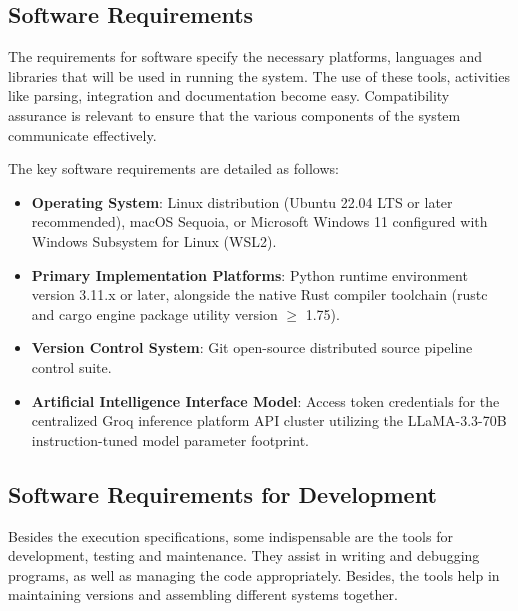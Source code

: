 \subsection{Software Requirements}
\hspace{0.5cm}
The requirements for software specify the necessary platforms, languages and libraries that will be used in running the system. The use of these tools, activities like parsing, integration and documentation become easy. Compatibility assurance is relevant to ensure that the various components of the system communicate effectively. 


The key software requirements are detailed as follows:
\begin{itemize}
    \item \textbf{Operating System}: Linux distribution (Ubuntu 22.04 LTS or later recommended), macOS Sequoia, or Microsoft Windows 11 configured with Windows Subsystem for Linux (WSL2).
    
    \item \textbf{Primary Implementation Platforms}: Python runtime environment version 3.11.x or later, alongside the native Rust compiler toolchain (rustc and cargo engine package utility version $\ge$ 1.75).
    
    \item \textbf{Version Control System}: Git open-source distributed source pipeline control suite.
    
    \item \textbf{Artificial Intelligence Interface Model}: Access token credentials for the centralized Groq inference platform API cluster utilizing the LLaMA-3.3-70B instruction-tuned model parameter footprint.
\end{itemize}

\subsection{Software Requirements for Development}
\hspace{0.5cm}Besides the execution specifications, some indispensable are the tools for development, testing and maintenance. They assist in writing and debugging programs, as well as managing the code appropriately. Besides, the tools help in maintaining versions and assembling different systems together. 

